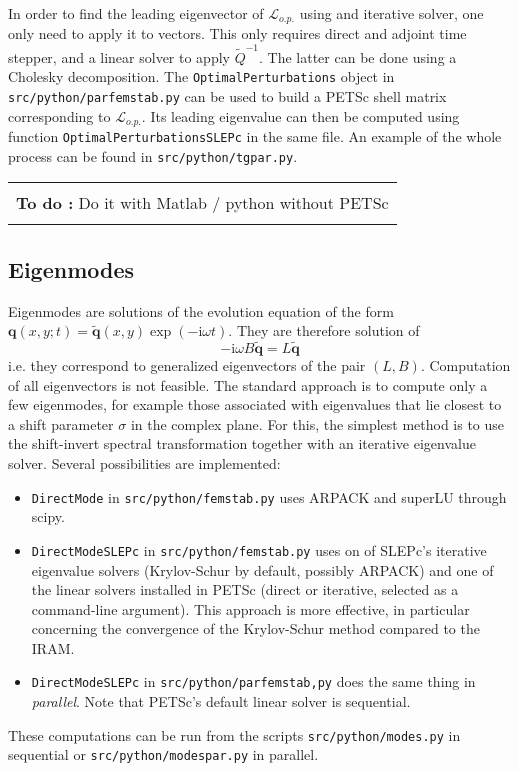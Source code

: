 \documentclass[12pts]{article}%
\def\v{\bm}
\def\i{\text{i}}
\def\wt{\widetilde}
\newenvironment{TODO}{\vspace{.25cm}\begin{center}\begin{tabular}{|p{.75\linewidth}|} \hline\\ \textbf{To do :}}
{ \\ \\\hline \end{tabular}\end{center}\vspace{.25cm}}
\begin{document}
In order to find the leading eigenvector of $\mathcal L_{o.p.}$ using
and iterative solver, one only need to apply it to vectors. This only
requires direct and adjoint time stepper, and a linear solver to apply
$\wt{Q}^{-1}$. The latter can be done using a Cholesky
decomposition. The \texttt{OptimalPerturbations} object in
\texttt{src/python/parfemstab.py} can be used to build a PETSc shell
matrix corresponding to $\mathcal L_{o.p.}$. Its leading eigenvalue
can then be computed using function \texttt{OptimalPerturbationsSLEPc}
in the same file. An example of the whole process can be found in
\texttt{src/python/tgpar.py}.

\begin{TODO}
Do it with Matlab / python without PETSc
\end{TODO}

\subsection{Eigenmodes}

Eigenmodes are solutions of the evolution equation of the form $\v
q(x,y;t) = \wt{\v q}(x,y) \exp(-\i\omega t)$. They are therefore
solution of
\begin{equation*}
  -\i\omega B \wt{\v q} = L \wt{\v q}
\end{equation*}
i.e. they correspond to generalized eigenvectors of the pair
$(L,B)$. Computation of all eigenvectors is not feasible. The standard
approach is to compute only a few eigenmodes, for example those
associated with eigenvalues that lie closest to a shift parameter
$\sigma$ in the complex plane. For this, the simplest method is to use
the shift-invert spectral transformation together with an iterative
eigenvalue solver. Several possibilities are implemented:
\begin{itemize}
\item \texttt{DirectMode} in \texttt{src/python/femstab.py} uses ARPACK
  and superLU through scipy.
\item \texttt{DirectModeSLEPc} in \texttt{src/python/femstab.py} uses on
  of SLEPc's iterative eigenvalue solvers (Krylov-Schur by default,
  possibly ARPACK) and one of the linear solvers installed in PETSc
  (direct or iterative, selected as a command-line argument). This
  approach is more effective, in particular concerning the convergence
  of the Krylov-Schur method compared to the IRAM.
\item \texttt{DirectModeSLEPc} in \texttt{src/python/parfemstab,py}
  does the same thing in \emph{parallel}. Note that PETSc's default linear
  solver is sequential.
\end{itemize}
These computations can be run from the scripts
\texttt{src/python/modes.py} in sequential or
\texttt{src/python/modespar.py} in parallel.
\end{document}

